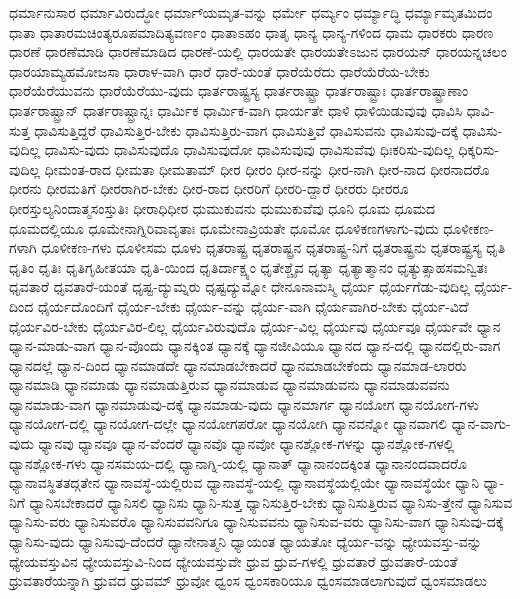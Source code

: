 {ಧರ್ಮಾನುಸಾರ
ಧರ್ಮಾವಿರುದ್ಧೋ
ಧರ್ಮಾ್ಯಮೃತ-ವನ್ನು
ಧರ್ಮೇ
ಧರ್ಮ್ಯಂ
ಧರ್ಮ್ಯಾದ್ಧಿ
ಧರ್ಮ್ಯಾಮೃತಮಿದಂ
ಧಾತಾ
ಧಾತಾರಮಚಿಂತ್ಯರೂಪಮಾದಿತ್ಯವರ್ಣಂ
ಧಾತಾಽಹಂ
ಧಾತೃ
ಧಾನ್ಯ
ಧಾನ್ಯ-ಗಳಿಂದ
ಧಾಮ
ಧಾರಕರು
ಧಾರಣ
ಧಾರಣೆ
ಧಾರಣೆಮಾಡಿ
ಧಾರಣೆಮಾಡಿದ
ಧಾರಣೆ-ಯಲ್ಲಿ
ಧಾರಯತೇ
ಧಾರಯತೇಽಜುನ
ಧಾರಯನ್
ಧಾರಯನ್ನಚಲಂ
ಧಾರಯಾಮ್ಯಹಮೋಜಸಾ
ಧಾರಾಳ-ವಾಗಿ
ಧಾರೆ
ಧಾರೆ-ಯಂತೆ
ಧಾರೆಯೆರೆದು
ಧಾರೆಯೆರೆಯ-ಬೇಕು
ಧಾರೆಯೆರೆಯುವನು
ಧಾರೆಯೆರೆಯು-ವುದು
ಧಾರ್ತರಾಷ್ಟ್ರಸ್ಯ
ಧಾರ್ತರಾಷ್ಟ್ರಾ
ಧಾರ್ತರಾಷ್ಟ್ರಾಃ
ಧಾರ್ತರಾಷ್ಟ್ರಾಣಾಂ
ಧಾರ್ತರಾಷ್ಟ್ರಾನ್
ಧಾರ್ತರಾಷ್ಟ್ರಾನ್ನಃ
ಧಾರ್ಮಿಕ
ಧಾರ್ಮಿಕ-ವಾಗಿ
ಧಾರ್ಯತೇ
ಧಾಳಿ
ಧಾಳಿಯಿಡುವುವು
ಧಾವಿಸಿ
ಧಾವಿ-ಸುತ್ತ
ಧಾವಿಸುತ್ತಿದ್ದರೆ
ಧಾವಿಸುತ್ತಿರ-ಬೇಕು
ಧಾವಿಸುತ್ತಿರು-ವಾಗ
ಧಾವಿಸುತ್ತಿವೆ
ಧಾವಿಸುವನು
ಧಾವಿಸುವು-ದಕ್ಕೆ
ಧಾವಿಸು-ವುದಿಲ್ಲ
ಧಾವಿಸು-ವುದು
ಧಾವಿಸುವುದೊ
ಧಾವಿಸುವುದೋ
ಧಾವಿಸುವುವು
ಧಾವಿಸುವೆವು
ಧಿಃಕರಿಸು-ವುದಿಲ್ಲ
ಧಿಕ್ಕರಿಸು-ವುದಿಲ್ಲ
ಧೀಮಂತ-ರಾದ
ಧೀಮತಾ
ಧೀಮತಾಮ್
ಧೀರ
ಧೀರಂ
ಧೀರ-ನನ್ನು
ಧೀರ-ನಾಗಿ
ಧೀರ-ನಾದ
ಧೀರನಾದರೊ
ಧೀರನು
ಧೀರಮತಿಗೆ
ಧೀರರಾಗಿರ-ಬೇಕು
ಧೀರ-ರಾದ
ಧೀರರಿಗೆ
ಧೀರರಿ-ದ್ದಾರೆ
ಧೀರರು
ಧೀರರೂ
ಧೀರಸ್ತುಲ್ಯನಿಂದಾತ್ಮಸಂಸ್ತುತಿಃ
ಧೀರಾಧಿಧೀರ
ಧುಮುಕುವನು
ಧುಮುಕುವೆವು
ಧೂನಿ
ಧೂಮ
ಧೂಮದ
ಧೂಮದಲ್ಲಿಯೂ
ಧೂಮೇನಾಗ್ನಿರಿವಾವೃತಾಃ
ಧೂಮೇನಾವ್ರಿಯತೇ
ಧೂಮೋ
ಧೂಳಿಕಣಗಳಾಗು-ವುದು
ಧೂಳೀಕಣ-ಗಳಾಗಿ
ಧೂಳೀಕಣ-ಗಳು
ಧೂಳೀಸಮ
ಧೂಳು
ಧೃತರಾಷ್ಟ್ರ
ಧೃತರಾಷ್ಟ್ರನ
ಧೃತರಾಷ್ಟ್ರ-ನಿಗೆ
ಧೃತರಾಷ್ಟ್ರನು
ಧೃತರಾಷ್ಟ್ರಸ್ಯ
ಧೃತಿ
ಧೃತಿಂ
ಧೃತಿಃ
ಧೃತಿಗೃಹೀತಯಾ
ಧೃತಿ-ಯಿಂದ
ಧೃತಿರ್ದಾಕ್ಷ್ಯಂ
ಧೃತೇಶ್ಚೈವ
ಧೃತ್ಯಾ
ಧೃತ್ಯಾತ್ಮಾನಂ
ಧೃತ್ಯುತ್ಸಾಹಸಮನ್ವಿತಃ
ಧೃವತಾರೆ
ಧೃವತಾರೆ-ಯಂತೆ
ಧೃಷ್ಟ-ದ್ಯುಮ್ನರು
ಧೃಷ್ಟದ್ಯುಮ್ನೋ
ಧೇನೂನಾಮಸ್ಮಿ
ಧೈರ್ಯ
ಧೈರ್ಯಗೆಡು-ವುದಿಲ್ಲ
ಧೈರ್ಯ-ದಿಂದ
ಧೈರ್ಯದೊಂದಿಗೆ
ಧೈರ್ಯ-ಬೇಕು
ಧೈರ್ಯ-ವನ್ನು
ಧೈರ್ಯ-ವಾಗಿ
ಧೈರ್ಯವಾಗಿರ-ಬೇಕು
ಧೈರ್ಯ-ವಿದೆ
ಧೈರ್ಯವಿರ-ಬೇಕು
ಧೈರ್ಯವಿರ-ಲಿಲ್ಲ
ಧೈರ್ಯವಿರುವುದೊ
ಧೈರ್ಯ-ವಿಲ್ಲ
ಧೈರ್ಯವು
ಧೈರ್ಯವೂ
ಧೈರ್ಯವೇ
ಧ್ಯಾನ
ಧ್ಯಾನ-ಮಾಡು-ವಾಗ
ಧ್ಯಾನ-ವೊಂದು
ಧ್ಯಾನಕ್ಕಿಂತ
ಧ್ಯಾನಕ್ಕೆ
ಧ್ಯಾನಜೀವಿಯೂ
ಧ್ಯಾನದ
ಧ್ಯಾನ-ದಲ್ಲಿ
ಧ್ಯಾನದಲ್ಲಿರು-ವಾಗ
ಧ್ಯಾನದಲ್ಲೆ
ಧ್ಯಾನ-ದಿಂದ
ಧ್ಯಾನಮಾಡದೇ
ಧ್ಯಾನಮಾಡಬೇಕಾದರೆ
ಧ್ಯಾನಮಾಡಬೇಕೆಂದು
ಧ್ಯಾನಮಾಡ-ಲಾರರು
ಧ್ಯಾನಮಾಡಿ
ಧ್ಯಾನಮಾಡು
ಧ್ಯಾನಮಾಡುತ್ತಿರುವ
ಧ್ಯಾನಮಾಡುವ
ಧ್ಯಾನಮಾಡುವನು
ಧ್ಯಾನಮಾಡುವವನು
ಧ್ಯಾನಮಾಡು-ವಾಗ
ಧ್ಯಾನಮಾಡುವು-ದಕ್ಕೆ
ಧ್ಯಾನಮಾಡು-ವುದು
ಧ್ಯಾನಮಾರ್ಗ
ಧ್ಯಾನಯೋಗ
ಧ್ಯಾನಯೋಗ-ಗಳು
ಧ್ಯಾನಯೋಗ-ದಲ್ಲಿ
ಧ್ಯಾನಯೋಗ-ದಲ್ಲೇ
ಧ್ಯಾನಯೋಗಪರೋ
ಧ್ಯಾನಯೋಗಿ
ಧ್ಯಾನವನ್ನೋ
ಧ್ಯಾನವಾಗಲಿ
ಧ್ಯಾನ-ವಾಗು-ವುದು
ಧ್ಯಾನವು
ಧ್ಯಾನವೂ
ಧ್ಯಾನ-ವೆಂದರೆ
ಧ್ಯಾನವೊ
ಧ್ಯಾನವೋ
ಧ್ಯಾನಶ್ಲೋಕ-ಗಳನ್ನು
ಧ್ಯಾನಶ್ಲೋಕ-ಗಳಲ್ಲಿ
ಧ್ಯಾನಶ್ಲೋಕ-ಗಳು
ಧ್ಯಾನಸಮಯ-ದಲ್ಲಿ
ಧ್ಯಾನಾಗ್ನಿ-ಯಲ್ಲಿ
ಧ್ಯಾನಾತ್
ಧ್ಯಾನಾನಂದಕ್ಕಿಂತ
ಧ್ಯಾನಾನಂದವಾದರೊ
ಧ್ಯಾನಾವಸ್ಥಿತತದ್ಗತೇನ
ಧ್ಯಾನಾವಸ್ಥೆ-ಯಲ್ಲಿರುವ
ಧ್ಯಾನಾವಸ್ಥೆ-ಯಲ್ಲಿ
ಧ್ಯಾನಾವಸ್ಥೆಯಲ್ಲಿಯೇ
ಧ್ಯಾನಾವಸ್ಥೆಯೇ
ಧ್ಯಾನಿ
ಧ್ಯಾ-ನಿಗೆ
ಧ್ಯಾನಿಸಬೇಕಾದರೆ
ಧ್ಯಾನಿಸಲಿ
ಧ್ಯಾನಿಸು
ಧ್ಯಾನಿ-ಸುತ್ತ
ಧ್ಯಾನಿಸುತ್ತಿರ-ಬೇಕು
ಧ್ಯಾನಿಸುತ್ತಿರುವ
ಧ್ಯಾನಿಸು-ತ್ತೇನೆ
ಧ್ಯಾನಿಸುವ
ಧ್ಯಾನಿಸು-ವರು
ಧ್ಯಾನಿಸುವರೊ
ಧ್ಯಾನಿಸುವವನಿಗೂ
ಧ್ಯಾನಿಸುವವನು
ಧ್ಯಾನಿಸುವ-ವರು
ಧ್ಯಾನಿಸು-ವಾಗ
ಧ್ಯಾನಿಸುವು-ದಕ್ಕೆ
ಧ್ಯಾನಿಸು-ವುದು
ಧ್ಯಾನಿಸುವು-ದೆಂದರೆ
ಧ್ಯಾನೇನಾತ್ಮನಿ
ಧ್ಯಾಯಂತ
ಧ್ಯಾಯತೋ
ಧ್ಯೆರ್ಯ-ವನ್ನು
ಧ್ಯೇಯವಸ್ತು-ವನ್ನು
ಧ್ಯೇಯವಸ್ತುವಿನ
ಧ್ಯೇಯವಸ್ತುವಿ-ನಿಂದ
ಧ್ಯೇಯವಸ್ತುವೇ
ಧ್ರುವ
ಧ್ರುವ-ಗಳಲ್ಲಿ
ಧ್ರುವತಾರೆ
ಧ್ರುವತಾರೆ-ಯಂತೆ
ಧ್ರುವತಾರೆಯನ್ನಾಗಿ
ಧ್ರುವದ
ಧ್ರುವಮ್
ಧ್ರುವೋ
ಧ್ವಂಸ
ಧ್ವಂಸಕಾರಿಯೂ
ಧ್ವಂಸಮಾಡಲಾಗುವುದೆ
ಧ್ವಂಸಮಾಡಲು
}
